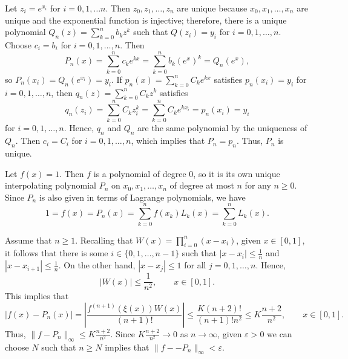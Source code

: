 \documentclass{homework}
\begin{document}
	\question Let $z_i = e^{x_i}$ for $i = 0, 1,\dots n$. Then $z_0, z_1,\dots, z_n$ are unique because $x_0, x_1, \dots, x_n$ are unique and the exponential function is injective; therefore, there is a unique polynomial $Q_n(z) = \sum_{k=0}^n b_kz^k$ such that $Q(z_i) = y_i$ for $i = 0,1,\dots, n$. Choose $c_i = b_i$ for $i = 0,1,\dots, n$. Then
	\begin{equation*}
		P_n(x) = \sum_{k=0}^nc_ke^{kx} = \sum_{k=0}^nb_k\left(e^x\right)^k = Q_n(e^x),
	\end{equation*}
	so $P_n(x_i) =Q_n(e^{x_i}) = y_i$. If $p_n(x) = \sum\limits_{k=0}^nC_ke^{kx}$ satisfies $p_n(x_i) = y_i$ for $i =0,1,\dots, n$, then $q_n(z) = \sum\limits_{k=0}^nC_kz^k$ satisfies
	\begin{equation*}
		q_n(z_i) = \sum_{k=0}^nC_kz_i^k = \sum_{k=0}^nC_ke^{kx_i} = p_n(x_i) = y_i
	\end{equation*}
	for $i = 0,1,\dots, n$. Hence, $q_n$ and $Q_n$ are the same polynomial by the uniqueness of $Q_n$. Then $c_i = C_i$ for $i = 0,1,\dots, n$, which implies that $P_n = p_n$. Thus, $P_n$ is unique.
	
	\question 
	\begin{alphaparts}
		\questionpart Let $f(x) = 1$. Then $f$ is a polynomial of degree 0, so it is its own unique interpolating polynomial $P_n$ on $x_0, x_1,\dots, x_n$ of degree at most $n$ for any $n \ge 0$. Since $P_n$ is also given in terms of Lagrange polynomials, we have
		\begin{equation*}
			1 = f(x) = P_n(x) = \sum_{k=0}^nf(x_k)L_k(x) = \sum_{k=0}^nL_k(x).
		\end{equation*}
		
		\questionpart Assume that $n \ge 1$. Recalling that $W(x) = \prod\limits_{i=0}^n (x - x_i)$, given $x \in [0,1]$, it follows that there is some $i \in \{0,1,\dots, n-1\}$ such that $|x-x_{i}| \le \frac{1}{n}$ and $|x-x_{i+1}|\le\frac{1}{n}$. On the other hand, $|x-x_j| \le 1$ for all $j=0,1,\dots,n$. Hence,
		\begin{equation*}
			|W(x)| \le \frac{1}{n^2}, \qquad x \in [0,1].
		\end{equation*}
		This implies that
		\begin{equation*}
			|f(x) - P_n(x)| = \left|\frac{f^{(n+1)}(\xi(x))W(x)}{(n+1)!}\right| \le \frac{K(n+2)!}{(n+1)!n^2} \le K\frac{n+2}{n^2}, \qquad x\in[0,1].
		\end{equation*}
		Thus, $\lVert f - P_n\rVert_\infty \le K\frac{n+2}{n^2}$. Since $K\frac{n+2}{n^2} \to 0$ as $n\to\infty$, given $\varepsilon > 0$ we can choose $N$ such that $n \ge N$ implies that $\lVert f -- P_n\rVert_\infty < \varepsilon$.
	\end{alphaparts}
\end{document}
